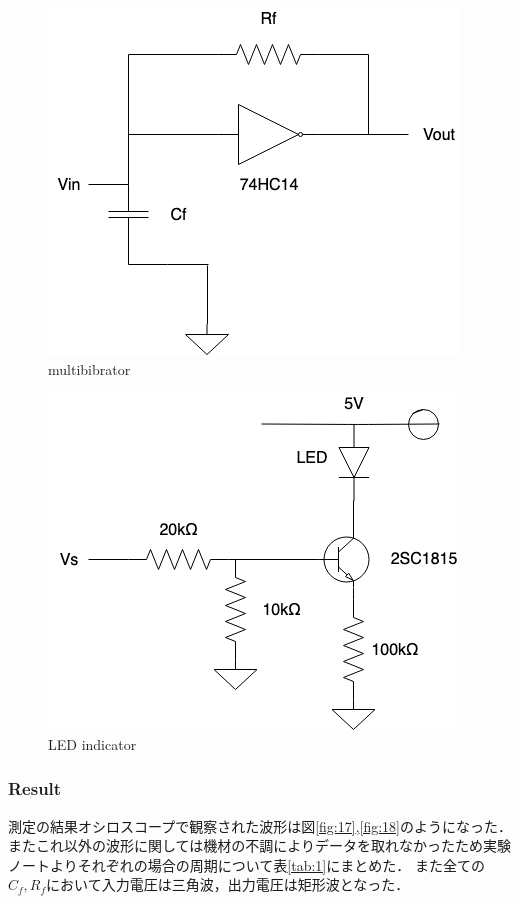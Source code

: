 \documentclass[11pt, a4paper,twocolumn]{jarticle}
\begin{document}
\begin{figure}[htbp]
 \begin{center}
  \includegraphics[width=0.8\linewidth]{fig8.png}
 \end{center}
 \caption{multibibrator}
 \label{fig:8}
\end{figure}

\begin{figure}[htbp]
 \begin{center}
  \includegraphics[width=0.8\linewidth]{fig9.png}
 \end{center}
 \caption{LED indicator}
 \label{fig:9}
\end{figure}

\subsubsection{Result}
測定の結果オシロスコープで観察された波形は図\ref{fig:17},\ref{fig:18}のようになった．
またこれ以外の波形に関しては機材の不調によりデータを取れなかったため実験ノートよりそれぞれの場合の周期について表\ref{tab:1}にまとめた．
また全ての$C_f,R_f$において入力電圧は三角波，出力電圧は矩形波となった．
\end{document}
